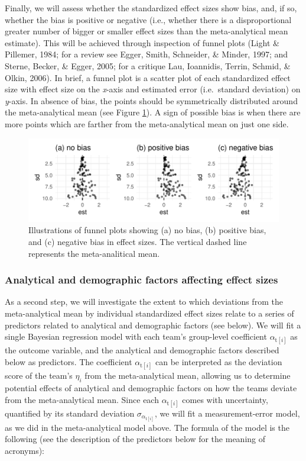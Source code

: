 \documentclass[
  english,
  man,floatsintext]{apa6}
\begin{document}
Finally, we will assess whether the standardized effect sizes show bias, and, if so, whether the bias is positive or negative (i.e., whether there is a disproportional greater number of bigger or smaller effect sizes than the meta-analytical mean estimate).
This will be achieved through inspection of funnel plots (Light \& Pillemer, 1984; for a review see Egger, Smith, Schneider, \& Minder, 1997; and Sterne, Becker, \& Egger, 2005; for a critique Lau, Ioannidis, Terrin, Schmid, \& Olkin, 2006).
In brief, a funnel plot is a scatter plot of each standardized effect size with effect size on the \emph{x}-axis and estimated error (i.e.~standard deviation) on \emph{y}-axis.
In absence of bias, the points should be symmetrically distributed around the meta-analytical mean (see Figure \ref{fig:funnel-plot}).
A sign of possible bias is when there are more points which are farther from the meta-analytical mean on just one side.

\begin{figure}
\centering
\includegraphics{Draft_RR_files/figure-latex/funnel-plot-1.pdf}
\caption{\label{fig:funnel-plot}Illustrations of funnel plots showing (a) no bias, (b) positive bias, and (c) negative bias in effect sizes. The vertical dashed line represents the meta-analitical mean.}
\end{figure}

\hypertarget{ana-factors}{%
\subsubsection{Analytical and demographic factors affecting effect sizes}\label{ana-factors}}

As a second step, we will investigate the extent to which deviations from the meta-analytical mean by individual standardized effect sizes relate to a series of predictors related to analytical and demographic factors (see below).
We will fit a single Bayesian regression model with each team's group-level coefficient \(\alpha_{\text{t}[i]}\) as the outcome variable, and the analytical and demographic factors described below as predictors.
The coefficient \(\alpha_{\text{t}[i]}\) can be interpreted as the deviation score of the team's \(\eta_i\) from the meta-analytical mean, allowing us to determine potential effects of analytical and demographic factors on how the teams deviate from the meta-analytical mean.
Since each \(\alpha_{\text{t}[i]}\) comes with uncertainty, quantified by its standard deviation \(\sigma_{\alpha_{\text{t}[i]}}\), we will fit a measurement-error model, as we did in the meta-analytical model above.
The formula of the model is the following (see the description of the predictors below for the meaning of acronyms):
\end{document}
